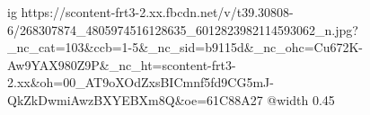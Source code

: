  
 
 
 
 

\ifcmt
  ig https://scontent-frt3-2.xx.fbcdn.net/v/t39.30808-6/268307874_4805974516128635_6012823982114593062_n.jpg?_nc_cat=103&ccb=1-5&_nc_sid=b9115d&_nc_ohc=Cu672K-Aw9YAX980Z9P&_nc_ht=scontent-frt3-2.xx&oh=00_AT9oXOdZxsBICmnf5fd9CG5mJ-QkZkDwmiAwzBXYEBXm8Q&oe=61C88A27
  @width 0.45
\fi
